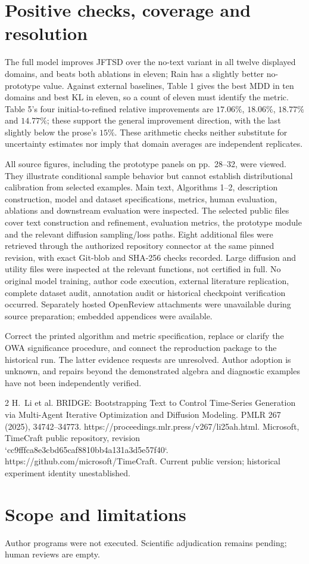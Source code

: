 \documentclass[10pt]{article}
\begin{document}
\section*{Positive checks, coverage and resolution}
The full model improves JFTSD over the no-text variant in all twelve displayed domains, and beats both ablations in eleven; Rain has a slightly better no-prototype value. Against external baselines, Table 1 gives the best MDD in ten domains and best KL in eleven, so a count of eleven must identify the metric. Table 5’s four initial-to-refined relative improvements are \(17.06\%\), \(18.06\%\), \(18.77\%\) and \(14.77\%\); these support the general improvement direction, with the last slightly below the prose’s \(15\%\). These arithmetic checks neither substitute for uncertainty estimates nor imply that domain averages are independent replicates.\par
All source figures, including the prototype panels on pp. 28–32, were viewed. They illustrate conditional sample behavior but cannot establish distributional calibration from selected examples. Main text, Algorithms 1–2, description construction, model and dataset specifications, metrics, human evaluation, ablations and downstream evaluation were inspected. The selected public files cover text construction and refinement, evaluation metrics, the prototype module and the relevant diffusion sampling/loss paths. Eight additional files were retrieved through the authorized repository connector at the same pinned revision, with exact Git-blob and SHA-256 checks recorded. Large diffusion and utility files were inspected at the relevant functions, not certified in full. No original model training, author code execution, external literature replication, complete dataset audit, annotation audit or historical checkpoint verification occurred. Separately hosted OpenReview attachments were unavailable during source preparation; embedded appendices were available.\par
Correct the printed algorithm and metric specification, replace or clarify the OWA significance procedure, and connect the reproduction package to the historical run. The latter evidence requests are unresolved. Author adoption is unknown, and repairs beyond the demonstrated algebra and diagnostic examples have not been independently verified.\par
2 H. Li et al. BRIDGE: Bootstrapping Text to Control Time-Series Generation via Multi-Agent Iterative Optimization and Diffusion Modeling. PMLR 267 (2025), 34742–34773. https://proceedings.mlr.press/v267/li25ah.html. Microsoft, TimeCraft public repository, revision `cc9fffca8e3cbd65caf8810bb4a131a3d5e57f40`. https://github.com/microsoft/TimeCraft. Current public version; historical experiment identity unestablished.\par
\section*{Scope and limitations}
Author programs were not executed. Scientific adjudication remains pending; human reviews are empty.\par
\end{document}
